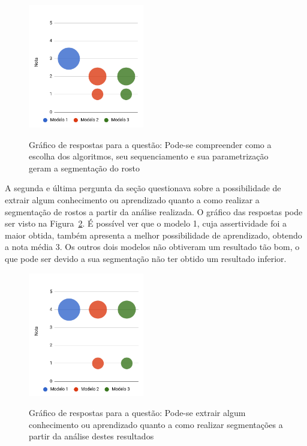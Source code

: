 \documentclass[12pt,oneside,a4paper,english,french,spanish,brazil,]{abntex2}
\begin{document}
\begin{figure}[ht]
\centering
\caption{Gráfico de respostas para a questão: Pode-se compreender como a escolha dos algoritmos, seu sequenciamento e sua parametrização geram a segmentação do rosto}
\includegraphics[width=0.45\textwidth]{imagens/Avaliacao_Juizes/Grafico_10.png}
\sourceAuthor{}
\label{fig:AJ_Qualidade_11}
\end{figure}

A segunda e última pergunta da seção questionava sobre a possibilidade de extrair algum conhecimento ou aprendizado quanto a como realizar a segmentação de rostos a partir da análise realizada. O gráfico das respostas pode ser visto na Figura~\ref{fig:AJ_Qualidade_12}. É possível ver que o modelo 1, cuja assertividade foi a maior obtida, também apresenta a melhor possibilidade de aprendizado, obtendo a nota média 3. Os outros dois modelos não obtiveram um resultado tão bom, o que pode ser devido a sua segmentação não ter obtido um resultado inferior.

\begin{figure}[ht]
\centering
\caption{Gráfico de respostas para a questão: Pode-se extrair algum conhecimento ou aprendizado quanto a como realizar segmentações a partir da análise destes resultados}
\includegraphics[width=0.45\textwidth]{imagens/Avaliacao_Juizes/Grafico_12.png}
\sourceAuthor{}
\label{fig:AJ_Qualidade_12}
\end{figure}
\end{document}
